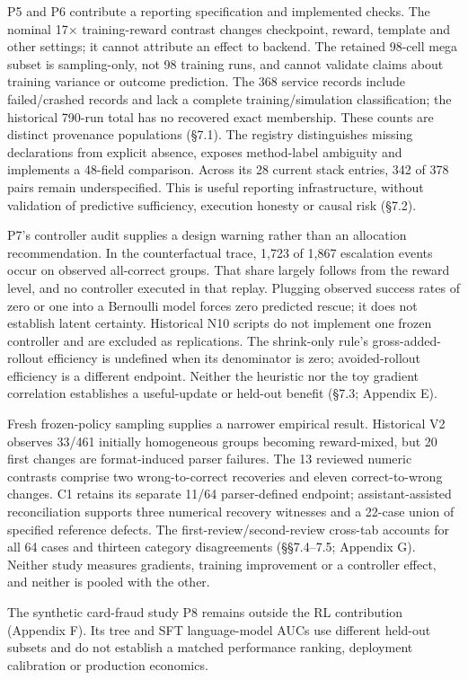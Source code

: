 \documentclass[12pt,a4paper]{report}
\begin{document}
P5 and P6 contribute a reporting specification and implemented checks.
The nominal 17× training-reward contrast changes checkpoint, reward,
template and other settings; it cannot attribute an effect to backend.
The retained 98-cell mega subset is sampling-only, not 98 training runs,
and cannot validate claims about training variance or outcome
prediction. The 368 service records include failed/crashed records and
lack a complete training/simulation classification; the historical
790-run total has no recovered exact membership. These counts are
distinct provenance populations (§7.1). The registry distinguishes
missing declarations from explicit absence, exposes method-label
ambiguity and implements a 48-field comparison. Across its 28 current
stack entries, 342 of 378 pairs remain underspecified. This is useful
reporting infrastructure, without validation of predictive sufficiency,
execution honesty or causal risk (§7.2).

P7's controller audit supplies a design warning rather than an
allocation recommendation. In the counterfactual trace, 1,723 of 1,867
escalation events occur on observed all-correct groups. That share
largely follows from the reward level, and no controller executed in
that replay. Plugging observed success rates of zero or one into a
Bernoulli model forces zero predicted rescue; it does not establish
latent certainty. Historical N10 scripts do not implement one frozen
controller and are excluded as replications. The shrink-only rule's
gross-added-rollout efficiency is undefined when its denominator is
zero; avoided-rollout efficiency is a different endpoint. Neither the
heuristic nor the toy gradient correlation establishes a useful-update
or held-out benefit (§7.3; Appendix E).

Fresh frozen-policy sampling supplies a narrower empirical result.
Historical V2 observes 33/461 initially homogeneous groups becoming
reward-mixed, but 20 first changes are format-induced parser failures.
The 13 reviewed numeric contrasts comprise two wrong-to-correct
recoveries and eleven correct-to-wrong changes. C1 retains its separate
11/64 parser-defined endpoint; assistant-assisted reconciliation
supports three numerical recovery witnesses and a 22-case union of
specified reference defects. The first-review/second-review cross-tab
accounts for all 64 cases and thirteen category disagreements
(§§7.4--7.5; Appendix G). Neither study measures gradients, training
improvement or a controller effect, and neither is pooled with the
other.

The synthetic card-fraud study P8 remains outside the RL contribution
(Appendix F). Its tree and SFT language-model AUCs use different
held-out subsets and do not establish a matched performance ranking,
deployment calibration or production economics.
\end{document}
